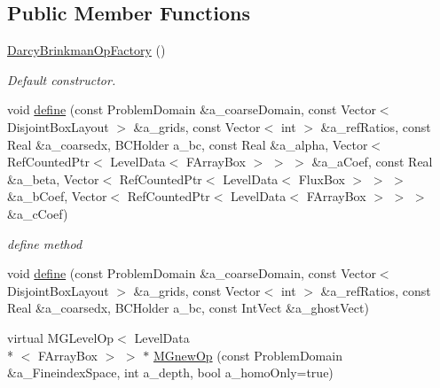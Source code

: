 \subsection*{Public Member Functions}
\begin{DoxyCompactItemize}
\item 
\hypertarget{class_darcy_brinkman_op_factory_a33cfe1c1920f58a73f46b7dc5b9b0f3b}{\hyperlink{class_darcy_brinkman_op_factory_a33cfe1c1920f58a73f46b7dc5b9b0f3b}{Darcy\-Brinkman\-Op\-Factory} ()}\label{class_darcy_brinkman_op_factory_a33cfe1c1920f58a73f46b7dc5b9b0f3b}

\begin{DoxyCompactList}\small\item\em Default constructor. \end{DoxyCompactList}\item 
void \hyperlink{class_darcy_brinkman_op_factory_adffcc15076241ed69d214197b2c21433}{define} (const Problem\-Domain \&a\-\_\-coarse\-Domain, const Vector$<$ Disjoint\-Box\-Layout $>$ \&a\-\_\-grids, const Vector$<$ int $>$ \&a\-\_\-ref\-Ratios, const Real \&a\-\_\-coarsedx, B\-C\-Holder a\-\_\-bc, const Real \&a\-\_\-alpha, Vector$<$ Ref\-Counted\-Ptr$<$ Level\-Data$<$ F\-Array\-Box $>$ $>$ $>$ \&a\-\_\-a\-Coef, const Real \&a\-\_\-beta, Vector$<$ Ref\-Counted\-Ptr$<$ Level\-Data$<$ Flux\-Box $>$ $>$ $>$ \&a\-\_\-b\-Coef, Vector$<$ Ref\-Counted\-Ptr$<$ Level\-Data$<$ F\-Array\-Box $>$ $>$ $>$ \&a\-\_\-c\-Coef)
\begin{DoxyCompactList}\small\item\em define method \end{DoxyCompactList}\item 
void \hyperlink{class_darcy_brinkman_op_factory_a128c500e2c129aa3bc6ba7e20bf23cf1}{define} (const Problem\-Domain \&a\-\_\-coarse\-Domain, const Vector$<$ Disjoint\-Box\-Layout $>$ \&a\-\_\-grids, const Vector$<$ int $>$ \&a\-\_\-ref\-Ratios, const Real \&a\-\_\-coarsedx, B\-C\-Holder a\-\_\-bc, const Int\-Vect \&a\-\_\-ghost\-Vect)
\item 
\hypertarget{class_darcy_brinkman_op_factory_a6b5e609db52c2363aa015eb0b811d98d}{virtual M\-G\-Level\-Op$<$ Level\-Data\\*
$<$ F\-Array\-Box $>$ $>$ $\ast$ \hyperlink{class_darcy_brinkman_op_factory_a6b5e609db52c2363aa015eb0b811d98d}{M\-Gnew\-Op} (const Problem\-Domain \&a\-\_\-\-Fineindex\-Space, int a\-\_\-depth, bool a\-\_\-homo\-Only=true)}\label{class_darcy_brinkman_op_factory_a6b5e609db52c2363aa015eb0b811d98d}


\end{DoxyCompactItemize}
